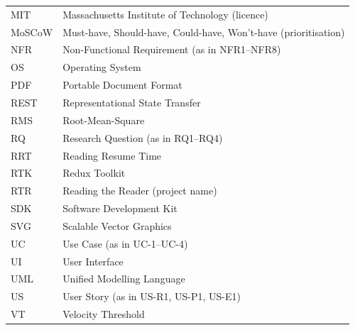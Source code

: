 \begin{longtable}{@{}p{3cm}p{11cm}@{}}
MIT   & Massachusetts Institute of Technology (licence) \\
MoSCoW & Must-have, Should-have, Could-have, Won't-have (prioritisation) \\
NFR   & Non-Functional Requirement (as in NFR1--NFR8) \\
OS    & Operating System \\
PDF   & Portable Document Format \\
REST  & Representational State Transfer \\
RMS   & Root-Mean-Square \\
RQ    & Research Question (as in RQ1--RQ4) \\
RRT   & Reading Resume Time \\
RTK   & Redux Toolkit \\
RTR   & Reading the Reader (project name) \\
SDK   & Software Development Kit \\
SVG   & Scalable Vector Graphics \\
UC    & Use Case (as in UC-1--UC-4) \\
UI    & User Interface \\
UML   & Unified Modelling Language \\
US    & User Story (as in US-R1, US-P1, US-E1) \\
VT    & Velocity Threshold \\
\end{longtable}
